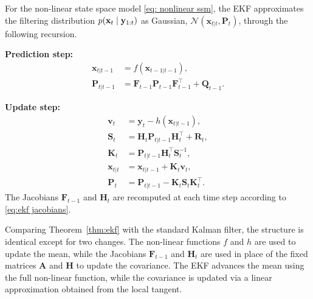 \begin{theorem}\label{thm:ekf}
    For the non-linear state space model \eqref{eq: nonlinear ssm}, the EKF approximates the filtering distribution $p(\mathbf{x}_{t} \mid \mathbf{y}_{1:t})$ as Gaussian, $\mathcal{N}(\mathbf{x}_{t|t}, \mathbf{P}_{t})$, through the following recursion.
    
    \noindent\textbf{Prediction step:}
    \begin{align}
      \mathbf{x}_{t|t-1} &= f(\mathbf{x}_{t-1|t-1}),\label{eq:ekf predict mean} \\
      \mathbf{P}_{t|t-1}  &= \mathbf{F}_{t-1}\mathbf{P}_{t-1}\mathbf{F}^{\top}_{t-1} + \mathbf{Q}_{t-1}.\label{eq:ekf predict cov}
    \end{align}
    
    \noindent\textbf{Update step:}
    \begin{align*}
      \mathbf{v}_{t}  &= \mathbf{y}_{t} - h(\mathbf{x}_{t|t-1}), \\
      \mathbf{S}_{t}   &= \mathbf{H}_{t}\mathbf{P}_{t|t-1}\mathbf{H}^{\top}_{t} + \mathbf{R}_{t}, \\
      \mathbf{K}_{t}   &= \mathbf{P}_{t|t-1}\mathbf{H}^{\top}_{t}\mathbf{S}^{-1}_{t}, \\
      \mathbf{x}_{t|t}  &= \mathbf{x}_{t|t-1} + \mathbf{K}_{t}\mathbf{v}_{t}, \\
      \mathbf{P}_{t}   &= \mathbf{P}_{t|t-1} - \mathbf{K}_{t}\mathbf{S}_{t}\mathbf{K}^{\top}_{t}.
    \end{align*}
    The Jacobians $\mathbf{F}_{t-1}$ and $\mathbf{H}_{t}$ are recomputed at each time step
    according to \eqref{eq:ekf jacobians}.
\end{theorem}

Comparing Theorem~\ref{thm:ekf} with the standard Kalman filter, the structure is identical except for two changes. The
non-linear functions $f$ and $h$ are used to update the mean, while the Jacobians $\mathbf{F}_{t-1}$ and $\mathbf{H}_{t}$ are used in place of the fixed matrices $\mathbf{A}$ and $\mathbf{H}$ to update the covariance. The EKF advances the mean using the full non-linear function, while the covariance is updated via a linear approximation obtained from the local tangent.


